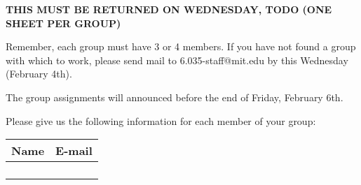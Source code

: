 
\thispagestyle{empty}

\onecolumn
{}

\vspace{.2in}

\begin{center}
{\bf
THIS MUST BE RETURNED ON WEDNESDAY, TODO
\newline
(ONE SHEET PER GROUP)}
\end{center}

\vspace{.2in}

Remember, each group must have 3 or 4 members. If you have not found
a group with which to work, please send mail to 6.035-staff@mit.edu
by this Wednesday (February 4th).

The group assignments will announced before the end of Friday,
February 6th.

Please give us the following information for each member of your
group:
\\

\begin{table}[h]
\centering
\begin{tabular}{|p{3in}|p{3in}|}
\hline
{\bf Name} & {\bf E-mail} \\ \hline
\vspace{.5in}& \\ \hline
\vspace{.5in}& \\ \hline
\vspace{.5in}& \\ \hline
\vspace{.5in}& \\ \hline
\end{tabular}
\end{table}


